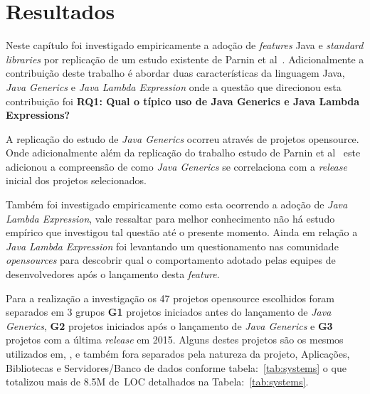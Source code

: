 \chapter{Resultados}
Neste capítulo foi investigado empiricamente a adoção de \textit{features} Java e \textit{standard libraries} por replicação de um estudo existente de Parnin et al~\cite{Parnin:ACM2011}. Adicionalmente a contribuição deste trabalho é abordar duas características da linguagem Java, \textit{Java Generics} e \textit{Java Lambda Expression} onde a questão que direcionou esta contribuição foi \textbf{RQ1: Qual o típico uso de Java Generics e Java Lambda Expressions?}
 

A replicação do estudo de \textit{Java Generics} ocorreu através de projetos opensource. Onde adicionalmente além da replicação do trabalho estudo de Parnin et al~\cite{Parnin:ACM2011} este adicionou a compreensão de como \textit{Java Generics} se correlaciona com a \textit{release} inicial dos projetos selecionados. 

Também foi investigado empiricamente como esta ocorrendo a adoção de \textit{Java Lambda Expression}, vale ressaltar para melhor conhecimento não há estudo empírico que investigou tal questão até o presente momento.
Ainda em relação a \textit{Java Lambda Expression} foi levantando um questionamento nas comunidade \textit{opensources} para descobrir qual o comportamento adotado pelas equipes de desenvolvedores após o lançamento desta \textit{feature}. 

Para a realização a investigação os 47 projetos opensource escolhidos foram separados em 3 grupos \textbf{G1} projetos iniciados antes do lançamento de \textit{Java Generics}, \textbf{G2} projetos iniciados após o lançamento de \textit{Java Generics} e \textbf{G3} projetos com a última \textit{release} em 2015. Alguns destes projetos são os mesmos utilizados em, \cite{Parnin:ACM2011, Dyer:ACM2014, ward2015performance}, e também fora separados pela natureza da projeto,  Aplicações, Bibliotecas e Servidores/Banco de dados conforme tabela:~\ref{tab:systems} o que totalizou mais de 8.5M de~\acs{LOC} detalhados na Tabela:~\ref*{tab:systems}.

